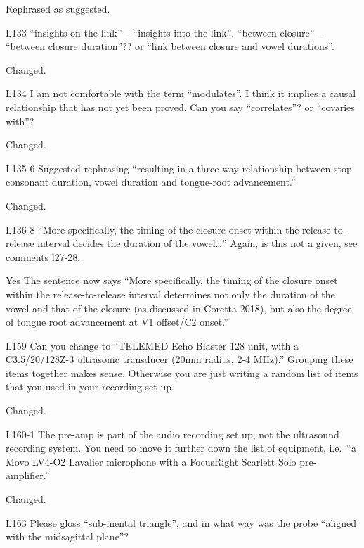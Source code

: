 \documentclass[]{article}
\begin{document}
\color{plum}

Rephrased as suggested. \color{black}

L133 ``insights on the link'' -- ``insights into the link'', ``between
closure'' -- ``between closure duration''?? or ``link between closure
and vowel durations''.

\color{plum}

Changed. \color{black}

L134 I am not comfortable with the term ``modulates''. I think it
implies a causal relationship that has not yet been proved. Can you say
``correlates''? or ``covaries with''?

\color{plum}

Changed. \color{black}

L135-6 Suggested rephrasing ``resulting in a three-way relationship
between stop consonant duration, vowel duration and tongue-root
advancement.''

\color{plum}

Changed. \color{black}

L136-8 ``More specifically, the timing of the closure onset within the
release-to-release interval decides the duration of the vowel\ldots{}''
Again, is this not a given, see comments l27-28.

\color{plum}

Yes The sentence now says ``More specifically, the timing of the closure
onset within the release-to-release interval determines not only the
duration of the vowel and that of the closure (as discussed in Coretta
2018), but also the degree of tongue root advancement at V1 offset/C2
onset.'' \color{black}

L159 Can you change to ``TELEMED Echo Blaster 128 unit, with a
C3.5/20/128Z-3 ultrasonic transducer (20mm radius, 2-4 MHz).'' Grouping
these items together makes sense. Otherwise you are just writing a
random list of items that you used in your recording set up.

\color{plum}

Changed. \color{black}

L160-1 The pre-amp is part of the audio recording set up, not the
ultrasound recording system. You need to move it further down the list
of equipment, i.e.~``a Movo LV4-O2 Lavalier microphone with a FocusRight
Scarlett Solo pre-amplifier.''

\color{plum}

Changed. \color{black}

L163 Please gloss ``sub-mental triangle'', and in what way was the probe
``aligned with the midsagittal plane''?
\end{document}
